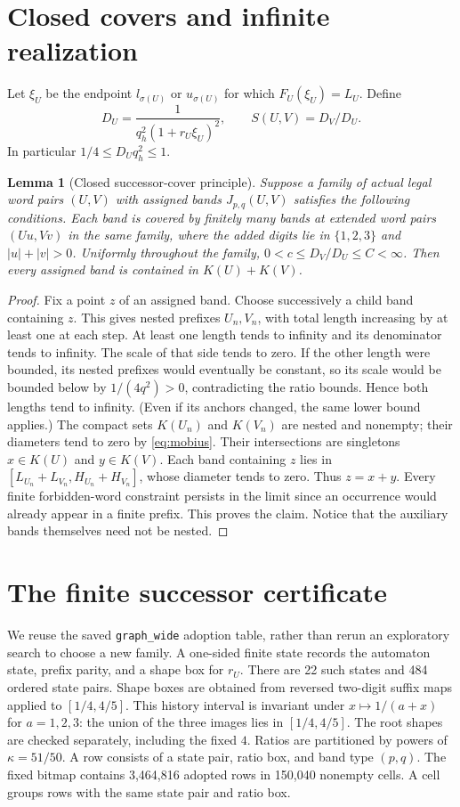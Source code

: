 \documentclass[11pt,a4paper]{article}
\newtheorem{lemma}[theorem]{Lemma}
\newcommand{\file}[1]{{\normalfont\small\nolinkurl{#1}}}
\begin{document}
\section{Closed covers and infinite realization}\label{sec:infinite}
Let $\xi_U$ be the endpoint $l_{\sigma(U)}$ or $u_{\sigma(U)}$ for which
$F_U(\xi_U)=L_U$. Define
\[
 D_U=\frac1{q_h^2(1+r_U\xi_U)^2},\qquad S(U,V)=D_V/D_U.
\]
In particular $1/4\le D_Uq_h^2\le1$.

\begin{lemma}[Closed successor-cover principle]\label{lem:cover}
Suppose a family of actual legal word pairs $(U,V)$ with assigned bands
$J_{p,q}(U,V)$ satisfies the following conditions. Each band is covered
by finitely many bands at extended word pairs $(Uu,Vv)$ in the same
family, where the added digits lie in $\{1,2,3\}$ and
$|u|+|v|>0$. Uniformly throughout the family,
$0<c\le D_V/D_U\le C<\infty$.
Then every assigned band is contained in $K(U)+K(V)$.
\end{lemma}
\begin{proof}
Fix a point $z$ of an assigned band. Choose successively a child band
containing $z$. This gives nested prefixes $U_n,V_n$, with total length
increasing by at least one at each step. At least one length tends to
infinity and its denominator tends to infinity. The scale of that side
tends to zero. If the other length were bounded, its nested prefixes
would eventually be constant, so its scale would be bounded below by
$1/(4q^2)>0$, contradicting the ratio bounds. Hence both lengths tend
to infinity. (Even if its anchors changed, the same lower bound applies.)
The compact sets $K(U_n)$ and $K(V_n)$ are nested and nonempty;
their diameters tend to zero by \eqref{eq:mobius}. Their intersections
are singletons $x\in K(U)$ and $y\in K(V)$.
Each band containing $z$ lies in
$[L_{U_n}+L_{V_n},H_{U_n}+H_{V_n}]$, whose diameter tends to zero.
Thus $z=x+y$. Every finite forbidden-word constraint persists in the
limit since an occurrence would already appear in a finite prefix.
This proves the claim. Notice that the auxiliary bands themselves need
not be nested.
\end{proof}

\section{The finite successor certificate}\label{sec:graph}
We reuse the saved \file{graph_wide} adoption table, rather than rerun
an exploratory search to choose a new family. A one-sided finite state
records the automaton state, prefix parity, and a shape box for $r_U$.
There are 22 such states and 484 ordered state pairs.
Shape boxes are obtained from reversed two-digit suffix maps applied to
$[1/4,4/5]$. This history interval is invariant under $x\mapsto1/(a+x)$
for $a=1,2,3$: the union of the three images lies in $[1/4,4/5]$.
The root shapes are checked separately, including the fixed $4$.
Ratios are partitioned by powers of $\kappa=51/50$.
A row consists of a state pair, ratio box, and band type $(p,q)$.
The fixed bitmap contains 3,464,816 adopted rows in 150,040 nonempty
cells. A cell groups rows with the same state pair and ratio box.
\end{document}
